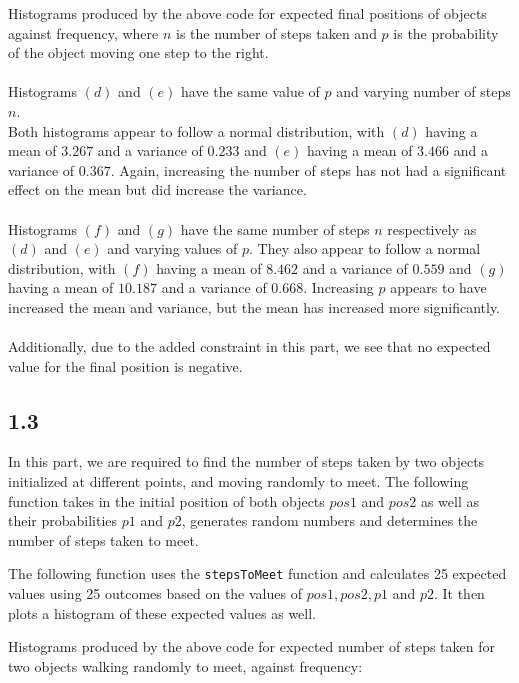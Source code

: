 \documentclass[answers]{exam}
\begin{document}
Histograms produced by the above code for expected final positions of objects against frequency, where $n$ is the number of steps taken and $p$ is the probability of the object moving one step to the right.\\
\\
Histograms $(d)$ and $(e)$ have the same value of $p$ and varying number of steps $n$. \\
Both histograms appear to follow a normal distribution, with $(d)$ having a mean of $3.267$ and a variance of $0.233$ and $(e)$ having a mean of $3.466$ and a variance of $0.367$. Again, increasing the number of steps has not had a significant effect on the mean but did increase the variance.\\ \\
Histograms $(f)$ and $(g)$ have the same number of steps $n$ respectively as $(d)$ and $(e)$ and varying values of $p$. 
They also appear to follow a normal distribution, with $(f)$ having a mean of $8.462$ and a variance of $0.559$ and $(g)$ having a mean of $10.187$ and a variance of $0.668$. Increasing $p$ appears to have increased the mean and variance, but the mean has increased more significantly. \\ \\
Additionally, due to the added constraint in this part, we see that no expected value for the final position is negative.

\pagebreak
\subsection*{1.3}
In this part, we are required to find the number of steps taken by two objects initialized at different points, and moving randomly to meet. The following function takes in the initial position of both objects $pos1$ and $pos2$ as well as their probabilities $p1$ and $p2$, generates random numbers and determines the number of steps taken to meet.

The following function uses the \texttt{stepsToMeet} function and calculates 25 expected values using 25 outcomes based on the values of $pos1, pos2, p1$ and $p2$. It then plots a histogram of these expected values as well.

\pagebreak
Histograms produced by the above code for expected number of steps taken for two objects walking randomly to meet, against frequency:\\
\end{document}
